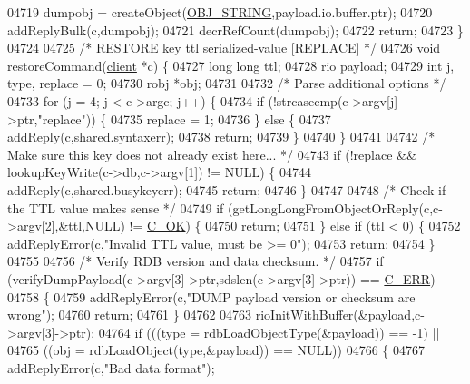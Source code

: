 \begin{DoxyCode}
{{{{{{{{{{{{{{{{{{{{{{{{{{{{{{{{{{{{{{{{{{{{{{{{{{{{{{{{{{{{{{{{{{{{{{{{{{{{{{{{{{{{{{{{{{{{{{{{{{{{{{{{{{04719     dumpobj = createObject(\hyperlink{server_8h_a65236ea160f69cdef33ec942092af88f}{OBJ\_STRING},payload.io.buffer.ptr);
04720     addReplyBulk(c,dumpobj);
04721     decrRefCount(dumpobj);
04722     \textcolor{keywordflow}{return};
04723 \}
04724 
04725 \textcolor{comment}{/* RESTORE key ttl serialized-value [REPLACE] */}
04726 \textcolor{keywordtype}{void} restoreCommand(\hyperlink{structclient}{client} *c) \{
04727     \textcolor{keywordtype}{long} \textcolor{keywordtype}{long} ttl;
04728     rio payload;
04729     \textcolor{keywordtype}{int} j, type, replace = 0;
04730     robj *obj;
04731 
04732     \textcolor{comment}{/* Parse additional options */}
04733     \textcolor{keywordflow}{for} (j = 4; j < c->argc; j++) \{
04734         \textcolor{keywordflow}{if} (!strcasecmp(c->argv[j]->ptr,\textcolor{stringliteral}{"replace"})) \{
04735             replace = 1;
04736         \} \textcolor{keywordflow}{else} \{
04737             addReply(c,shared.syntaxerr);
04738             \textcolor{keywordflow}{return};
04739         \}
04740     \}
04741 
04742     \textcolor{comment}{/* Make sure this key does not already exist here... */}
04743     \textcolor{keywordflow}{if} (!replace && lookupKeyWrite(c->db,c->argv[1]) != NULL) \{
04744         addReply(c,shared.busykeyerr);
04745         \textcolor{keywordflow}{return};
04746     \}
04747 
04748     \textcolor{comment}{/* Check if the TTL value makes sense */}
04749     \textcolor{keywordflow}{if} (getLongLongFromObjectOrReply(c,c->argv[2],&ttl,NULL) != \hyperlink{server_8h_a303769ef1065076e68731584e758d3e1}{C\_OK}) \{
04750         \textcolor{keywordflow}{return};
04751     \} \textcolor{keywordflow}{else} \textcolor{keywordflow}{if} (ttl < 0) \{
04752         addReplyError(c,\textcolor{stringliteral}{"Invalid TTL value, must be >= 0"});
04753         \textcolor{keywordflow}{return};
04754     \}
04755 
04756     \textcolor{comment}{/* Verify RDB version and data checksum. */}
04757     \textcolor{keywordflow}{if} (verifyDumpPayload(c->argv[3]->ptr,sdslen(c->argv[3]->ptr)) == \hyperlink{server_8h_af98ac28d5f4d23d7ed5985188e6fb7d1}{C\_ERR})
04758     \{
04759         addReplyError(c,\textcolor{stringliteral}{"DUMP payload version or checksum are wrong"});
04760         \textcolor{keywordflow}{return};
04761     \}
04762 
04763     rioInitWithBuffer(&payload,c->argv[3]->ptr);
04764     \textcolor{keywordflow}{if} (((type = rdbLoadObjectType(&payload)) == -1) ||
04765         ((obj = rdbLoadObject(type,&payload)) == NULL))
04766     \{
04767         addReplyError(c,\textcolor{stringliteral}{"Bad data format"});
}}}}}}}}}}}}}}}}}}}}}}}}}}}}}}}}}}}}}}}}}}}}}}}}}}}}}}}}}}}}}}}}}}}}}}}}}}}}}}}}}}}}}}}}}}}}}}}}}}}}}}}}}}
\end{DoxyCode}
